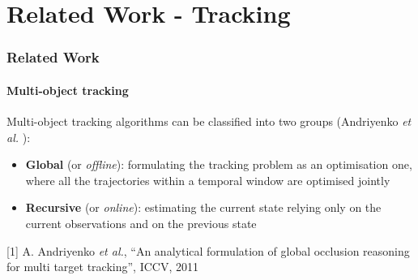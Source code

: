 \section{Related Work - Tracking}

\begin{frame}
	\frametitle{Related Work}
	\framesubtitle{Multi-object tracking}
	
	\Large
	
	\vspace{0.6cm}
	
	Multi-object tracking algorithms can be classified into two groups (Andriyenko \emph{et al.}
	\cite{Andriyenko11}):
	
	\begin{itemize}
		\item \textbf{Global} (or \emph{offline}): formulating the tracking problem as an optimisation
			  one, where all the trajectories within a temporal window are optimised jointly
		\item \textbf{Recursive} (or \emph{online}): estimating the current state relying only on the
			  current observations and on the previous state
	\end{itemize}
	
	\vspace{0.45cm}
	
	\tiny
	
	[1] A. Andriyenko \emph{et al.}, ``An analytical formulation of global occlusion reasoning for
		multi target tracking'', ICCV, 2011
\end{frame}

